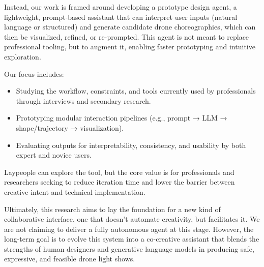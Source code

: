 Instead, our work is framed around developing a prototype design agent, a lightweight, prompt-based assistant that can interpret user inputs (natural language or structured) and generate candidate drone choreographies, which can then be visualized, refined, or re-prompted. This agent is not meant to replace professional tooling, but to augment it, enabling faster prototyping and intuitive exploration.

Our focus includes:
\begin{itemize}
  \item Studying the workflow, constraints, and tools currently used by professionals through interviews and secondary research.
  \item Prototyping modular interaction pipelines (e.g., prompt → LLM → shape/trajectory → visualization).
  \item Evaluating outputs for interpretability, consistency, and usability by both expert and novice users.
\end{itemize}

Laypeople can explore the tool, but the core value is for professionals and researchers seeking to reduce iteration time and lower the barrier between creative intent and technical implementation.

Ultimately, this research aims to lay the foundation for a new kind of collaborative interface, one that doesn't automate creativity, but facilitates it. We are not claiming to deliver a fully autonomous agent at this stage. However, the long-term goal is to evolve this system into a co-creative assistant that blends the strengths of human designers and generative language models in producing safe, expressive, and feasible drone light shows.
